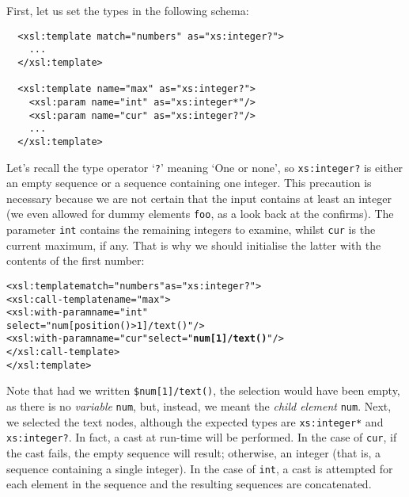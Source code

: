 \noindent First, let us set the types in the following schema:
\begin{verbatim}
  <xsl:template match="numbers" as="xs:integer?">
    ...
  </xsl:template>

  <xsl:template name="max" as="xs:integer?">
    <xsl:param name="int" as="xs:integer*"/>
    <xsl:param name="cur" as="xs:integer?"/>
    ...
  </xsl:template>
\end{verbatim}
Let's recall the type operator `\texttt{?}' meaning `One or none', so
\texttt{xs:integer?} is either an empty sequence or a sequence
containing one integer. This precaution is necessary because we are
not certain that the input contains at least an integer (we even
allowed for dummy elements \texttt{foo}, as a look back at the \DTD
confirms). The parameter \texttt{int} contains the remaining integers
to examine, whilst \texttt{cur} is the current maximum, if any. That
is why we should initialise the latter with the contents of the first
number:
\begin{alltt}
  <xsl:template match="numbers" as="xs:integer?">
    <xsl:call-template name="max">
      <xsl:with-param name="int"
                      select="num[position()>1]/text()"/>
      <xsl:with-param name="cur" select="\textbf{num[1]/text()}"/>
    </xsl:call-template>
  </xsl:template>
\end{alltt}
Note that had we written \texttt{\$num[1]/text()}, the selection would
have been empty, as there is no \emph{variable} \texttt{num}, but,
instead, we meant the \emph{child element} \texttt{num}. Next, we
selected the text nodes, although the expected types are
\texttt{xs:integer*} and \texttt{xs:integer?}. In fact, a cast at
run\hyp{}time will be performed. In the case of \texttt{cur}, if the
cast fails, the empty sequence will result; otherwise, an integer
(that is, a sequence containing a single integer). In the case of
\texttt{int}, a cast is attempted for each element in the sequence and
the resulting sequences are concatenated.


